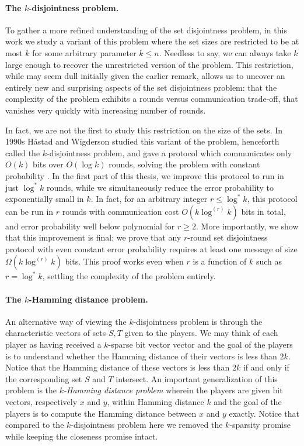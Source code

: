 \paragraph{The $k$-disjointness problem.}
To gather a more refined understanding of the set disjointness problem, 
in this work we study a variant of this problem where
 the set sizes are restricted to be at most $k$ for some arbitrary parameter $k\le n$. 
Needless to say, we can always take $k$ large enough to 
recover the unrestricted version of the problem.
This restriction, while may seem dull initially given the earlier remark, 
 allows us to
uncover an entirely new and surprising aspects of the set disjointness problem: 
that the complexity of the problem exhibits a rounds versus communication trade-off,
that vanishes very quickly with increasing number of rounds.

In fact, we are not the first to study this restriction 
on the size of the sets.
In 1990s Håstad and Wigderson studied this variant of the problem,
henceforth called the $k$-disjointness problem,
and gave a protocol which communicates only $O(k)$ bits over $O(\log k)$ rounds,
solving the problem with constant probability \cite{HastadW1990, ParnafesIRWA1997, HastadW2007}.
In the first part of this thesis, we improve this protocol 
to run in just $\log^*k$ rounds, while we simultaneously reduce the error probability to
exponentially small in $k$. In fact, for an arbitrary integer $r\le \log^* k$, this protocol 
can be run in $r$ rounds with communication cost $O(k\log^{(r)}k)$ bits in total,
 and error probability well below polynomial for $r\ge 2$.
More importantly, we show that this improvement is final: we prove that any $r$-round 
set disjointness protocol with even constant error probability requires at least one message of size
$\Omega(k\log^{(r)}k)$ bits. This proof works even when $r$ is a function of $k$ such as $r=\log^* k$, 
settling the complexity of the problem entirely.
 
\paragraph{The $k$-Hamming distance problem.} 
An alternative way of viewing the $k$-disjointness problem is through the characteristic 
vectors of sets $S, T$ given to the players.
We may think of each player as having received a $k$-sparse bit vector vector and the goal 
of the players is to understand whether the Hamming distance of their vectors is less than $2k$.
Notice that the Hamming distance of these vectors is less than $2k$ if and only if the 
corresponding set $S$ and $T$ intersect.
An important generalization of this problem is the {\em $k$-Hamming distance problem} 
wherein the players are given bit vectors, respectively $x$ and $y$,
within Hamming distance $k$ and the goal of the players is to compute the Hamming distance 
between $x$ and $y$ exactly. Notice that compared to the $k$-disjointness problem here 
we removed the $k$-sparsity promise while keeping the closeness promise intact.

